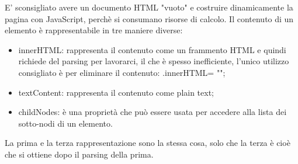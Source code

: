 \newline
E' sconsigliato avere un documento HTML "vuoto" e costruire dinamicamente la pagina con JavaScript, perchè si consumano risorse di calcolo.\newline
\newline
Il contenuto di un elemento è rappresentabile in tre maniere diverse:
\begin{itemize}
    \item innerHTML: rappresenta il contenuto come un frammento HTML e quindi richiede del parsing per lavorarci, il che è spesso inefficiente, l'unico utilizzo consigliato è per eliminare il contenuto: .innerHTML= "";
    \item textContent: rappresenta il contenuto come plain text;
    \item childNodes: è una proprietà che può essere usata per accedere alla lista dei sotto-nodi di un elemento.
\end{itemize}
La prima e la terza rappresentazione sono la stessa cosa, solo che la terza è cioè che si ottiene dopo il parsing della prima.